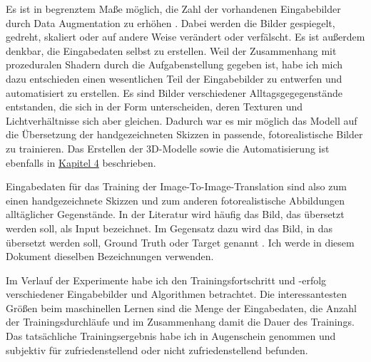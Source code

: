 Es ist in begrenztem Maße möglich, die Zahl der vorhandenen Eingabebilder durch Data Augmentation zu erhöhen \cite{chollet2017dlpython}. Dabei werden die Bilder gespiegelt, gedreht, skaliert oder auf andere Weise verändert oder verfälscht. Es ist außerdem denkbar, die Eingabedaten selbst zu erstellen. Weil der Zusammenhang mit prozeduralen Shadern durch die Aufgabenstellung gegeben ist, habe ich mich dazu entschieden einen wesentlichen Teil der Eingabebilder zu entwerfen und automatisiert zu erstellen. Es sind Bilder verschiedener Alltagsgegegenstände entstanden, die sich in der Form unterscheiden, deren Texturen und Lichtverhältnisse sich aber gleichen. Dadurch war es mir möglich das Modell auf die Übersetzung der handgezeichneten Skizzen in passende, fotorealistische Bilder zu trainieren. Das Erstellen der 3D-Modelle sowie die Automatisierung ist ebenfalls in \hyperref[ch:conduct]{Kapitel 4} beschrieben.

Eingabedaten für das Training der Image-To-Image-Translation sind also zum einen handgezeichnete Skizzen und zum anderen fotorealistische Abbildungen alltäglicher Gegenstände. In der Literatur wird häufig das Bild, das übersetzt werden soll, als Input bezeichnet. Im Gegensatz dazu wird das Bild, in das übersetzt werden soll, Ground Truth oder Target genannt \cite{chollet2017dlpython}. Ich werde in diesem Dokument dieselben Bezeichnungen verwenden.

Im Verlauf der Experimente habe ich den Trainingsfortschritt und -erfolg verschiedener Eingabebilder und Algorithmen betrachtet. Die interessantesten Größen beim maschinellen Lernen sind die Menge der Eingabedaten, die Anzahl der Trainingsdurchläufe und im Zusammenhang damit die Dauer des Trainings. Das tatsächliche Trainingsergebnis habe ich in Augenschein genommen und subjektiv für zufriedenstellend oder nicht zufriedenstellend befunden.


